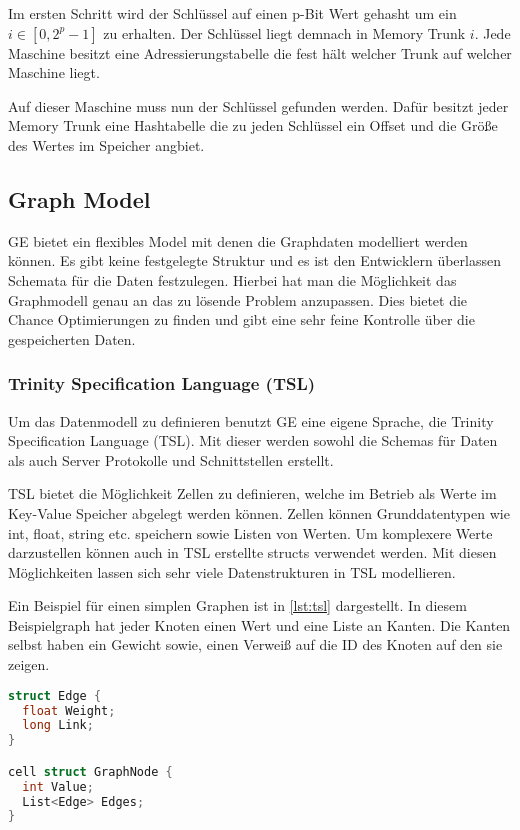 Im ersten Schritt wird der Schlüssel auf einen p-Bit Wert gehasht um ein  $ i \in [0, 2^{p} - 1] $ zu erhalten. Der Schlüssel liegt demnach in
Memory Trunk $ i $. Jede Maschine besitzt eine Adressierungstabelle die fest hält welcher Trunk auf welcher Maschine liegt.

Auf dieser Maschine muss nun der Schlüssel gefunden werden. Dafür besitzt jeder Memory Trunk eine Hashtabelle die zu jeden Schlüssel
ein Offset und die Größe des Wertes im Speicher angbiet.

\subsection{Graph Model}

GE bietet ein flexibles Model mit denen die Graphdaten modelliert werden können. Es gibt keine festgelegte Struktur und es ist den Entwicklern
überlassen Schemata für die Daten festzulegen. Hierbei hat man die Möglichkeit das Graphmodell genau an das zu lösende Problem anzupassen.
Dies bietet die Chance Optimierungen zu finden und gibt eine sehr feine Kontrolle über die gespeicherten Daten.

\subsubsection{Trinity Specification Language (TSL)}

Um das Datenmodell zu definieren benutzt GE eine eigene Sprache, die Trinity Specification Language (TSL). Mit dieser werden sowohl die Schemas
für Daten als auch Server Protokolle und Schnittstellen erstellt. 

TSL bietet die Möglichkeit Zellen zu definieren, welche im Betrieb als Werte im Key-Value Speicher abgelegt werden können.
Zellen können Grunddatentypen wie int, float, string etc. speichern sowie Listen von Werten. Um komplexere Werte darzustellen können auch in TSL erstellte structs verwendet werden.
Mit diesen Möglichkeiten lassen sich sehr viele Datenstrukturen in TSL modellieren. 

Ein Beispiel für einen simplen Graphen ist in  \ref{lst:tsl} dargestellt. In diesem Beispielgraph hat jeder Knoten 
einen Wert und eine Liste an Kanten. Die Kanten selbst haben ein Gewicht sowie, einen Verweiß auf die ID des Knoten auf den sie zeigen.

\begin{lstlisting}[language=c,label={lst:tsl}, caption={Beispiel für einen in TSL definierte Graphenstruktur}]
struct Edge {
  float Weight;
  long Link;
}

cell struct GraphNode {
  int Value;
  List<Edge> Edges;
}
\end{lstlisting}



